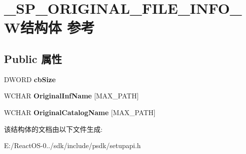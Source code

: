 \hypertarget{struct___s_p___o_r_i_g_i_n_a_l___f_i_l_e___i_n_f_o___w}{}\section{\+\_\+\+S\+P\+\_\+\+O\+R\+I\+G\+I\+N\+A\+L\+\_\+\+F\+I\+L\+E\+\_\+\+I\+N\+F\+O\+\_\+\+W结构体 参考}
\label{struct___s_p___o_r_i_g_i_n_a_l___f_i_l_e___i_n_f_o___w}
\subsection*{Public 属性}
\begin{DoxyCompactItemize}
\item 
\mbox{\label{struct___s_p___o_r_i_g_i_n_a_l___f_i_l_e___i_n_f_o___w_a2e7ed3cbad5684e4a911aad310892a39}} 
D\+W\+O\+RD {\bfseries cb\+Size}
\item 
\mbox{\label{struct___s_p___o_r_i_g_i_n_a_l___f_i_l_e___i_n_f_o___w_ae6446ade5c1d3af79fcfd95fdb0f88b9}} 
W\+C\+H\+AR {\bfseries Original\+Inf\+Name} \mbox{[}M\+A\+X\+\_\+\+P\+A\+TH\mbox{]}
\item 
\mbox{\label{struct___s_p___o_r_i_g_i_n_a_l___f_i_l_e___i_n_f_o___w_ad75d7ceaddce9ca053205e4a823346cc}} 
W\+C\+H\+AR {\bfseries Original\+Catalog\+Name} \mbox{[}M\+A\+X\+\_\+\+P\+A\+TH\mbox{]}
\end{DoxyCompactItemize}


该结构体的文档由以下文件生成\+:\begin{DoxyCompactItemize}
\item 
E\+:/\+React\+O\+S-\/0../sdk/include/psdk/setupapi.\+h\end{DoxyCompactItemize}
